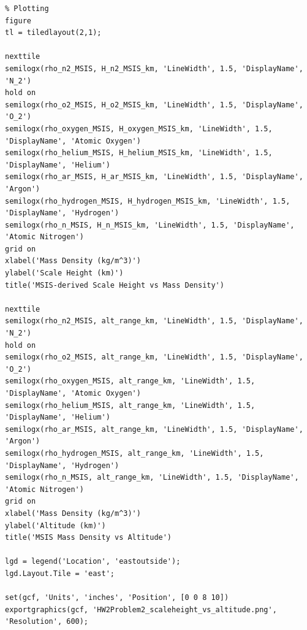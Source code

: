 \documentclass[11pt]{article}
\begin{document}
\begin{lstlisting}
% Plotting
figure
tl = tiledlayout(2,1);

nexttile
semilogx(rho_n2_MSIS, H_n2_MSIS_km, 'LineWidth', 1.5, 'DisplayName', 'N_2')
hold on
semilogx(rho_o2_MSIS, H_o2_MSIS_km, 'LineWidth', 1.5, 'DisplayName', 'O_2')
semilogx(rho_oxygen_MSIS, H_oxygen_MSIS_km, 'LineWidth', 1.5, 'DisplayName', 'Atomic Oxygen')
semilogx(rho_helium_MSIS, H_helium_MSIS_km, 'LineWidth', 1.5, 'DisplayName', 'Helium')
semilogx(rho_ar_MSIS, H_ar_MSIS_km, 'LineWidth', 1.5, 'DisplayName', 'Argon')
semilogx(rho_hydrogen_MSIS, H_hydrogen_MSIS_km, 'LineWidth', 1.5, 'DisplayName', 'Hydrogen')
semilogx(rho_n_MSIS, H_n_MSIS_km, 'LineWidth', 1.5, 'DisplayName', 'Atomic Nitrogen')
grid on
xlabel('Mass Density (kg/m^3)')
ylabel('Scale Height (km)')
title('MSIS-derived Scale Height vs Mass Density')

nexttile
semilogx(rho_n2_MSIS, alt_range_km, 'LineWidth', 1.5, 'DisplayName', 'N_2')
hold on
semilogx(rho_o2_MSIS, alt_range_km, 'LineWidth', 1.5, 'DisplayName', 'O_2')
semilogx(rho_oxygen_MSIS, alt_range_km, 'LineWidth', 1.5, 'DisplayName', 'Atomic Oxygen')
semilogx(rho_helium_MSIS, alt_range_km, 'LineWidth', 1.5, 'DisplayName', 'Helium')
semilogx(rho_ar_MSIS, alt_range_km, 'LineWidth', 1.5, 'DisplayName', 'Argon')
semilogx(rho_hydrogen_MSIS, alt_range_km, 'LineWidth', 1.5, 'DisplayName', 'Hydrogen')
semilogx(rho_n_MSIS, alt_range_km, 'LineWidth', 1.5, 'DisplayName', 'Atomic Nitrogen')
grid on
xlabel('Mass Density (kg/m^3)')
ylabel('Altitude (km)')
title('MSIS Mass Density vs Altitude')

lgd = legend('Location', 'eastoutside');
lgd.Layout.Tile = 'east';

set(gcf, 'Units', 'inches', 'Position', [0 0 8 10])
exportgraphics(gcf, 'HW2Problem2_scaleheight_vs_altitude.png', 'Resolution', 600);
\end{lstlisting}

\newpage
\end{document}
